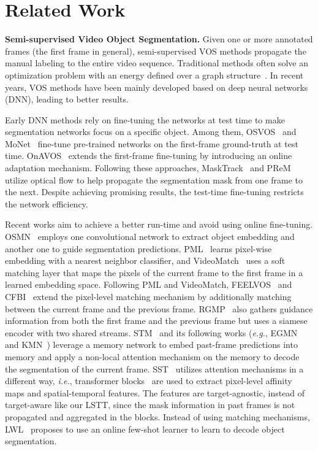 \documentclass{article}
\def\eg{\emph{e.g.}}
\def\ie{\emph{i.e.}}
\begin{document}
 
\section{Related Work}

\noindent\textbf{Semi-supervised Video Object Segmentation.}
Given one or more annotated frames (the first frame in general), semi-supervised VOS methods propagate the manual labeling to the entire video sequence. Traditional methods often solve an optimization problem with an energy defined over a graph structure~\cite{tradition1,tradition3,tradition2}. In recent years, VOS methods have been mainly developed based on deep neural networks (DNN), leading to better results.

Early DNN methods rely on fine-tuning the networks at test time to make segmentation networks focus on a specific object. Among them, OSVOS~\cite{osvos} and MoNet~\cite{xiao2018monet} fine-tune pre-trained networks on the first-frame ground-truth at test time. OnAVOS~\cite{onavos} extends the first-frame fine-tuning by introducing an online adaptation mechanism. Following these approaches, MaskTrack~\cite{masktrack} and PReM~\cite{premvos} 
utilize optical flow to help propagate the segmentation mask from one frame to the next. Despite achieving promising results, the test-time fine-tuning restricts the network efficiency.

Recent works aim to achieve a better run-time and avoid using online fine-tuning. OSMN~\cite{osmn} employs one convolutional network to extract object embedding and another one to guide segmentation predictions. PML~\cite{pml} learns pixel-wise embedding with a nearest neighbor classifier, and VideoMatch~\cite{videomatch} uses a soft matching layer that maps the pixels of the current frame to the first frame in a learned embedding space. Following PML and VideoMatch, FEELVOS~\cite{feelvos} and CFBI~\cite{cfbi,cfbip} extend the pixel-level matching mechanism by additionally matching between the current frame and the previous frame. RGMP~\cite{rgmp} also gathers guidance information from both the first frame and the previous frame but uses a siamese encoder with two shared streams. STM~\cite{spacetime} and its following works (\eg, EGMN~\cite{EGMN} and KMN~\cite{KMN}) leverage a memory network to embed past-frame predictions into memory and apply a non-local attention mechanism on the memory to decode the segmentation of the current frame. SST~\cite{sstvos} utilizes attention mechanisms in a different way, \ie, transformer blocks~\cite{transformer} are used to extract pixel-level affinity maps and spatial-temporal features. The features are target-agnostic, instead of target-aware like our LSTT, since the mask information in past frames is not propagated and aggregated in the blocks. Instead of using matching mechanisms, LWL~\cite{LWLVOS} proposes to use an online few-shot learner to learn to decode object segmentation.
\end{document}
